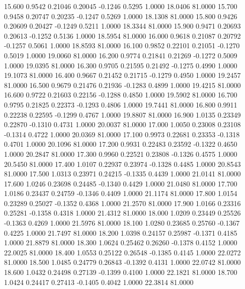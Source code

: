   15.600   0.9542   0.21046   0.20045  -0.1246   0.5295   1.0000  18.0406  81.0000
  15.700   0.9458   0.20747   0.20235  -0.1247   0.5269   1.0000  18.1308  81.0000
  15.800   0.9426   0.20609   0.20427  -0.1249   0.5211   1.0000  18.3344  81.0000
  15.900   0.9471   0.20693   0.20613  -0.1252   0.5136   1.0000  18.5954  81.0000
  16.000   0.9618   0.21087   0.20792  -0.1257   0.5061   1.0000  18.8593  81.0000
  16.100   0.9852   0.22101   0.21051  -0.1270   0.5019   1.0000  19.0060  81.0000
  16.200   0.9774   0.21841   0.21269  -0.1272   0.5009   1.0000  19.0395  81.0000
  16.300   0.9705   0.21595   0.21492  -0.1275   0.4990   1.0000  19.1073  81.0000
  16.400   0.9667   0.21452   0.21715  -0.1279   0.4950   1.0000  19.2457  81.0000
  16.500   0.9679   0.21476   0.21936  -0.1283   0.4899   1.0000  19.4215  81.0000
  16.600   0.9722   0.21603   0.22156  -0.1288   0.4850   1.0000  19.5902  81.0000
  16.700   0.9795   0.21825   0.22373  -0.1293   0.4806   1.0000  19.7441  81.0000
  16.800   0.9911   0.22238   0.22595  -0.1299   0.4767   1.0000  19.8807  81.0000
  16.900   1.0135   0.23349   0.22870  -0.1310   0.4731   1.0000  20.0037  81.0000
  17.000   1.0050   0.23008   0.23108  -0.1314   0.4722   1.0000  20.0369  81.0000
  17.100   0.9973   0.22681   0.23353  -0.1318   0.4701   1.0000  20.1096  81.0000
  17.200   0.9931   0.22483   0.23592  -0.1322   0.4650   1.0000  20.2847  81.0000
  17.300   0.9960   0.22521   0.23808  -0.1326   0.4575   1.0000  20.5450  81.0000
  17.400   1.0107   0.22937   0.23974  -0.1328   0.4485   1.0000  20.8543  81.0000
  17.500   1.0313   0.23971   0.24215  -0.1335   0.4439   1.0000  21.0141  81.0000
  17.600   1.0246   0.23698   0.24485  -0.1340   0.4429   1.0000  21.0480  81.0000
  17.700   1.0186   0.23437   0.24759  -0.1346   0.4409   1.0000  21.1174  81.0000
  17.800   1.0154   0.23289   0.25027  -0.1352   0.4368   1.0000  21.2570  81.0000
  17.900   1.0166   0.23316   0.25281  -0.1358   0.4318   1.0000  21.4312  81.0000
  18.000   1.0209   0.23449   0.25526  -0.1363   0.4269   1.0000  21.5976  81.0000
  18.100   1.0280   0.23685   0.25760  -0.1367   0.4225   1.0000  21.7497  81.0000
  18.200   1.0398   0.24157   0.25987  -0.1371   0.4185   1.0000  21.8879  81.0000
  18.300   1.0624   0.25462   0.26260  -0.1378   0.4152   1.0000  22.0025  81.0000
  18.400   1.0553   0.25122   0.26548  -0.1385   0.4145   1.0000  22.0272  81.0000
  18.500   1.0485   0.24779   0.26843  -0.1392   0.4131   1.0000  22.0742  81.0000
  18.600   1.0432   0.24498   0.27139  -0.1399   0.4100   1.0000  22.1821  81.0000
  18.700   1.0424   0.24417   0.27413  -0.1405   0.4042   1.0000  22.3814  81.0000
